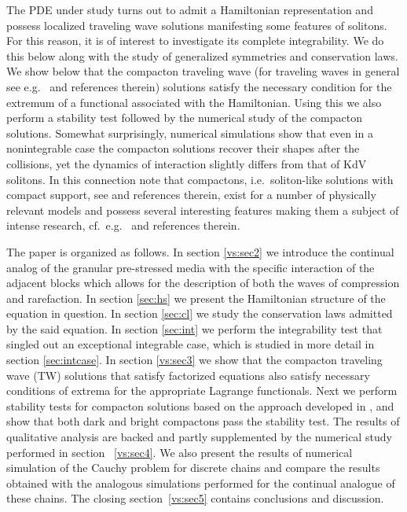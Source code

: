 \documentclass[12pt]{article}
\begin{document}
The PDE under study turns out to admit a Hamiltonian representation and possess localized traveling wave solutions manifesting some features of solitons. For this reason, it is of interest to investigate its complete integrability. We do this below along with the study of generalized symmetries and conservation laws. We show below that the compacton traveling wave (for traveling waves in general see e.g.\ \cite{Dodd, Valls} and references therein) solutions satisfy the necessary condition for the extremum of a functional associated with the Hamiltonian. Using this we also perform a stability test followed by the numerical study of the compacton solutions. Somewhat surprisingly, numerical simulations show that even in a nonintegrable case the compacton solutions recover their shapes after the collisions, yet the dynamics of interaction slightly differs from that of KdV solitons. In this connection note that compactons, i.e.\ soliton-like solutions with compact support, see \cite{Nester_83,NestLaz_85,Hyman-Rosenau} and references therein, exist for a number of physically relevant models and possess several interesting features making them a subject of intense research, cf.\ e.g.\ \cite{RosenauKmn, Saccomandi, Rosenau_06,  Vodova, CIS, Rosenau17} and references therein.

The paper is organized as follows. In section \ref{vs:sec2} we introduce the continual analog of the granular pre-stressed media with the specific interaction of the adjacent blocks which allows for the description of both the waves of compression and rarefaction.  In section \ref{sec:hs} we present the Hamiltonian structure of the equation in question. In section \ref{sec:cl} we study the conservation laws admitted by the said equation. In section \ref{sec:int} we perform the integrability test that singled out an exceptional integrable case, which is studied in more detail in section \ref{sec:intcase}. In section \ref{vs:sec3} we show that the compacton traveling wave (TW) solutions that satisfy factorized equations also satisfy necessary conditions of extrema for the appropriate Lagrange functionals.  Next we perform  stability tests for compacton solutions based on the approach developed in \cite{Derrick_64, Zakharov_86, Karpman_95}, and show that both dark and bright compactons pass the stability test. The results of qualitative analysis are backed and partly supplemented by the numerical study performed in section ~\ref{vs:sec4}.
We also present the results of numerical simulation of the Cauchy problem for discrete chains and compare the results obtained  with the analogous simulations performed for the continual analogue of these chains. The closing section~\ref{vs:sec5} contains conclusions and discussion.
\end{document}
